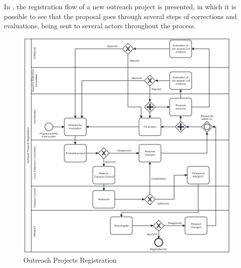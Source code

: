 
In , the registration flow of a new outreach project is presented, in which it is possible to see that the proposal goes through several steps of corrections and evaluations, being sent to several actors throughout the process.

\begin{figure}[htb]
  \caption{Outreach Projects Registration}\label{fig:outreach-projects-registration}
  \begin{center}
    \includegraphics[width=16cm]{img/registroDeProjetosDeExtensaoV3.png}
  \end{center}
\end{figure}

